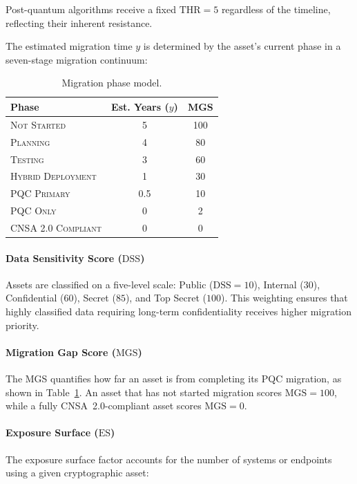 \documentclass[conference,10pt]{IEEEtran}
\newcommand{\thr}{\textrm{THR}}
\newcommand{\dss}{\textrm{DSS}}
\newcommand{\mgs}{\textrm{MGS}}
\newcommand{\es}{\textrm{ES}}
\begin{document}
\noindent Post-quantum algorithms receive a fixed $\thr = 5$ regardless
of the timeline, reflecting their inherent resistance.

The estimated migration time $y$ is determined by the asset's current
phase in a seven-stage migration continuum:

\begin{table}[t]
\centering
\caption{Migration phase model.}
\label{tab:migration-phases}
\footnotesize
\begin{tabular}{@{}lcc@{}}
\toprule
\textbf{Phase} & \textbf{Est. Years ($y$)} & \textbf{MGS} \\
\midrule
\textsc{Not Started}        & 5   & 100 \\
\textsc{Planning}           & 4   & 80  \\
\textsc{Testing}            & 3   & 60  \\
\textsc{Hybrid Deployment}  & 1   & 30  \\
\textsc{PQC Primary}        & 0.5 & 10  \\
\textsc{PQC Only}           & 0   & 2   \\
\textsc{CNSA 2.0 Compliant} & 0   & 0   \\
\bottomrule
\end{tabular}
\end{table}

\paragraph{Data Sensitivity Score ($\dss$)}
Assets are classified on a five-level scale: Public ($\dss{=}10$),
Internal ($30$), Confidential ($60$), Secret ($85$), and Top Secret
($100$). This weighting ensures that highly classified data requiring
long-term confidentiality receives higher migration priority.

\paragraph{Migration Gap Score ($\mgs$)}
The MGS quantifies how far an asset is from completing its PQC
migration, as shown in Table~\ref{tab:migration-phases}. An asset that
has not started migration scores $\mgs = 100$, while a fully
CNSA~2.0-compliant asset scores $\mgs = 0$.

\paragraph{Exposure Surface ($\es$)}
The exposure surface factor accounts for the number of systems or
endpoints using a given cryptographic asset:
\end{document}
